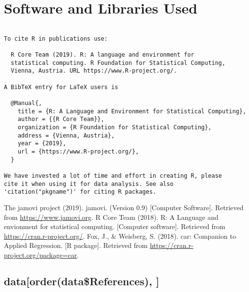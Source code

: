 \documentclass[]{article}
\begin{document}
\pagebreak

\hypertarget{software-and-libraries-used}{%
\section{Software and Libraries
Used}\label{software-and-libraries-used}}

\begin{verbatim}

To cite R in publications use:

  R Core Team (2019). R: A language and environment for
  statistical computing. R Foundation for Statistical Computing,
  Vienna, Austria. URL https://www.R-project.org/.

A BibTeX entry for LaTeX users is

  @Manual{,
    title = {R: A Language and Environment for Statistical Computing},
    author = {{R Core Team}},
    organization = {R Foundation for Statistical Computing},
    address = {Vienna, Austria},
    year = {2019},
    url = {https://www.R-project.org/},
  }

We have invested a lot of time and effort in creating R, please
cite it when using it for data analysis. See also
'citation("pkgname")' for citing R packages.
\end{verbatim}

The jamovi project (2019). jamovi. (Version 0.9) {[}Computer
Software{]}. Retrieved from \url{https://www.jamovi.org}. R Core Team
(2018). R: A Language and envionment for statistical computing.
{[}Computer software{]}. Retrieved from
\url{https://cran.r-project.org/}. Fox, J., \& Weisberg, S. (2018). car:
Companion to Applied Regression. {[}R package{]}. Retrieved from
\url{https://cran.r-project.org/package=car}.

\hypertarget{dataorderdatareferences}{%
\subsection{data{[}order(data\$References),
{]}}\label{dataorderdatareferences}}
\end{document}
